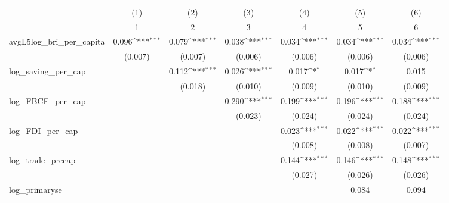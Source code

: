{
\def\sym#1{\ifmmode^{#1}\else\(^{#1}\)\fi}
\begin{tabular}{l*{6}{c}}
\toprule
            &\multicolumn{1}{c}{(1)}&\multicolumn{1}{c}{(2)}&\multicolumn{1}{c}{(3)}&\multicolumn{1}{c}{(4)}&\multicolumn{1}{c}{(5)}&\multicolumn{1}{c}{(6)}\\
            &\multicolumn{1}{c}{1}&\multicolumn{1}{c}{2}&\multicolumn{1}{c}{3}&\multicolumn{1}{c}{4}&\multicolumn{1}{c}{5}&\multicolumn{1}{c}{6}\\
\midrule
avgL5log\_bri\_per\_capita&       0.096\sym{***}&       0.079\sym{***}&       0.038\sym{***}&       0.034\sym{***}&       0.034\sym{***}&       0.034\sym{***}\\
            &     (0.007)         &     (0.007)         &     (0.006)         &     (0.006)         &     (0.006)         &     (0.006)         \\
\addlinespace
log\_saving\_per\_cap&                     &       0.112\sym{***}&       0.026\sym{***}&       0.017\sym{*}  &       0.017\sym{*}  &       0.015         \\
            &                     &     (0.018)         &     (0.010)         &     (0.009)         &     (0.010)         &     (0.009)         \\
\addlinespace
log\_FBCF\_per\_cap&                     &                     &       0.290\sym{***}&       0.199\sym{***}&       0.196\sym{***}&       0.188\sym{***}\\
            &                     &                     &     (0.023)         &     (0.024)         &     (0.024)         &     (0.024)         \\
\addlinespace
log\_FDI\_per\_cap&                     &                     &                     &       0.023\sym{***}&       0.022\sym{***}&       0.022\sym{***}\\
            &                     &                     &                     &     (0.008)         &     (0.008)         &     (0.007)         \\
\addlinespace
log\_trade\_precap&                     &                     &                     &       0.144\sym{***}&       0.146\sym{***}&       0.148\sym{***}\\
            &                     &                     &                     &     (0.027)         &     (0.026)         &     (0.026)         \\
\addlinespace
log\_primaryse&                     &                     &                     &                     &       0.084         &       0.094         \\

\end{tabular}}

